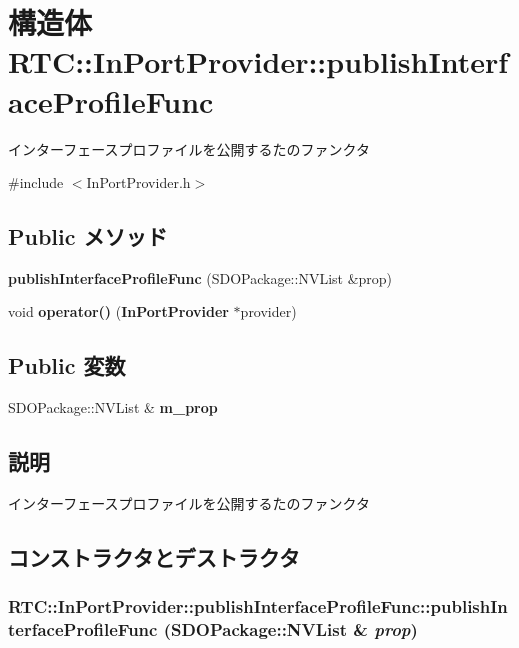 \section{構造体 RTC::InPortProvider::publishInterfaceProfileFunc}
\label{structRTC_1_1InPortProvider_1_1publishInterfaceProfileFunc}


インターフェースプロファイルを公開するたのファンクタ  




{\ttfamily \#include $<$InPortProvider.h$>$}

\subsection*{Public メソッド}
\begin{DoxyCompactItemize}
\item 
{\bf publishInterfaceProfileFunc} (SDOPackage::NVList \&prop)
\item 
void {\bf operator()} ({\bf InPortProvider} $\ast$provider)
\end{DoxyCompactItemize}
\subsection*{Public 変数}
\begin{DoxyCompactItemize}
\item 
SDOPackage::NVList \& {\bf m\_\-prop}
\end{DoxyCompactItemize}


\subsection{説明}
インターフェースプロファイルを公開するたのファンクタ 

\subsection{コンストラクタとデストラクタ}
\subsubsection[{publishInterfaceProfileFunc}]{\setlength{\rightskip}{0pt plus 5cm}RTC::InPortProvider::publishInterfaceProfileFunc::publishInterfaceProfileFunc (SDOPackage::NVList \& {\em prop})\hspace{0.3cm}{\ttfamily  [inline]}}\label{structRTC_1_1InPortProvider_1_1publishInterfaceProfileFunc_a44152ee251252826d013c08af31b178b}


